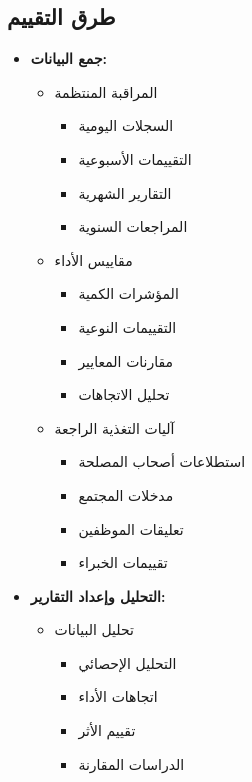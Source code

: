 \subsection{طرق التقييم}
\begin{itemize}
    \item \textbf{جمع البيانات:}
    \begin{itemize}
        \item المراقبة المنتظمة
        \begin{itemize}
            \item السجلات اليومية
            \item التقييمات الأسبوعية
            \item التقارير الشهرية
            \item المراجعات السنوية
        \end{itemize}
        
        \item مقاييس الأداء
        \begin{itemize}
            \item المؤشرات الكمية
            \item التقييمات النوعية
            \item مقارنات المعايير
            \item تحليل الاتجاهات
        \end{itemize}
        
        \item آليات التغذية الراجعة
        \begin{itemize}
            \item استطلاعات أصحاب المصلحة
            \item مدخلات المجتمع
            \item تعليقات الموظفين
            \item تقييمات الخبراء
        \end{itemize}
    \end{itemize}
    
    \item \textbf{التحليل وإعداد التقارير:}
    \begin{itemize}
        \item تحليل البيانات
        \begin{itemize}
            \item التحليل الإحصائي
            \item اتجاهات الأداء
            \item تقييم الأثر
            \item الدراسات المقارنة
        \end{itemize}
        

\end{itemize}
\end{itemize}
